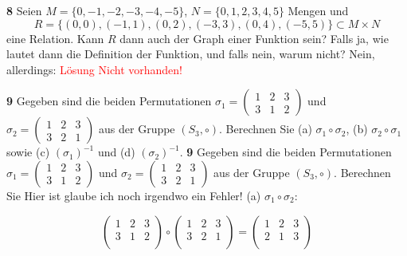 \documentclass[11pt]{article}
\begin{document}
    \textbf{8} Seien \( M = \{0,-1,-2,-3,-4,-5\} \), \( N = \{0,1,2,3,4,5\} \) Mengen und
    \[ R = \{(0,0),(-1,1),(0,2),(-3,3),(0,4),(-5,5)\} \subset M \times N \]
    eine Relation. Kann \( R \) dann auch der Graph einer Funktion sein? Falls ja, wie lautet dann die Definition der Funktion, und falls nein, warum nicht?\newline
    Nein, allerdings: \textcolor{red}{Lösung Nicht vorhanden!}\newline

    \textbf{9} Gegeben sind die beiden Permutationen \(\sigma_{1} = \begin{pmatrix} 1 & 2 & 3 \\ 3 & 1 & 2 \end{pmatrix}\) und \(\sigma_{2} = \begin{pmatrix} 1 & 2 & 3 \\ 3 & 2 & 1 \end{pmatrix}\) aus der Gruppe \( (S_3, \circ) \). Berechnen Sie (a) \(\sigma_{1} \circ \sigma_{2}\), (b) \(\sigma_{2} \circ \sigma_{1}\) sowie (c) \((\sigma_{1})^{-1}\) und (d) \((\sigma_{2})^{-1}\).
\textbf{9} Gegeben sind die beiden Permutationen \(\sigma_{1} = \begin{pmatrix} 1 & 2 & 3 \\ 3 & 1 & 2 \end{pmatrix}\) und \(\sigma_{2} = \begin{pmatrix} 1 & 2 & 3 \\ 3 & 2 & 1 \end{pmatrix}\) aus der Gruppe \( (S_3, \circ) \). Berechnen Sie
\newline\newline\newline Hier ist glaube ich noch irgendwo ein Fehler!\newline
(a) \(\sigma_{1} \circ \sigma_{2}\):

\[
    \begin{pmatrix}
        1 & 2 & 3 \\
        3 & 1 & 2 \\
    \end{pmatrix}
    \circ
    \begin{pmatrix}
        1 & 2 & 3 \\
        3 & 2 & 1 \\
    \end{pmatrix}
    =
    \begin{pmatrix}
        1 & 2 & 3 \\
        2 & 1 & 3 \\
    \end{pmatrix}
\]
\end{document}
